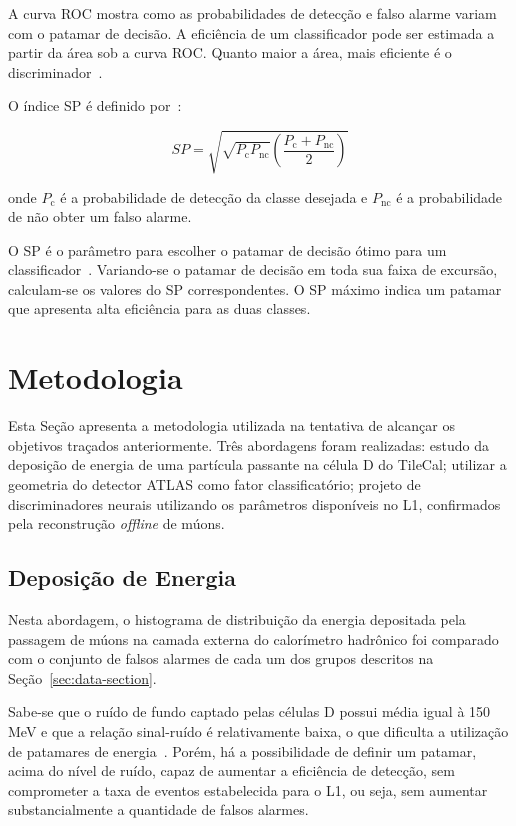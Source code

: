 A curva ROC mostra como as probabilidades de detecção e falso alarme variam com
o patamar de decisão. A eficiência de um classificador pode ser estimada a
partir da área sob a curva ROC. Quanto maior a área, mais eficiente é o
discriminador~\cite{ref:SIMAS}.

O índice SP é definido por~\cite{CIODARO2012}:

\begin{equation}
SP = \sqrt{\sqrt{P_{\text{c}}P_{\text{nc}}} \left(\frac{P_{\text{c}} +
P_{\text{nc}}}{2}\right)}
\end{equation}

onde $P_\text{c}$ é a probabilidade de detecção da classe desejada e
$P_{\text{nc}}$ é a probabilidade de não obter um falso alarme.

O SP é  o parâmetro para escolher o patamar de decisão ótimo para um
classificador~\cite{ref:SIMAS}. Variando-se o patamar de decisão em toda sua
faixa de excursão, calculam-se os valores do SP correspondentes. O SP máximo
indica um patamar que apresenta alta eficiência para as duas classes.

\section{Metodologia}

Esta Seção apresenta a metodologia utilizada na tentativa de alcançar os
objetivos traçados anteriormente. Três abordagens foram realizadas: estudo da
deposição de energia de uma partícula passante na célula D do TileCal; utilizar
a geometria do detector ATLAS como fator classificatório; projeto de
discriminadores neurais utilizando os parâmetros disponíveis no L1, confirmados
pela reconstrução \emph{offline} de múons.

\subsection*{Deposição de Energia}

Nesta abordagem, o histograma de distribuição da energia depositada pela
passagem de múons na camada externa do calorímetro hadrônico foi comparado com o
conjunto de falsos alarmes de cada um dos grupos descritos na
Seção~\ref{sec:data-section}.

Sabe-se que o ruído de fundo captado pelas células D possui média igual à 150
MeV e que a relação sinal-ruído é relativamente baixa, o que dificulta a
utilização de patamares de energia~\cite{CIODARO2009}. Porém, há a possibilidade
de definir um patamar, acima do nível de ruído, capaz de aumentar a eficiência
de detecção, sem comprometer a taxa de eventos estabelecida para o L1, ou seja,
sem aumentar substancialmente a quantidade de falsos alarmes.

